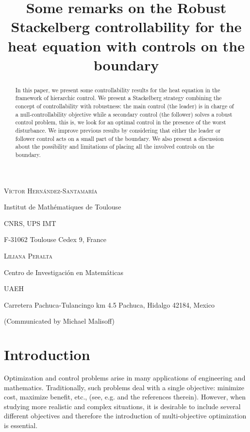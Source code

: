 \documentclass{dcds-bOF}
\title[Robust Stackelberg controllability for the heat equation] %
      {Some remarks on the Robust Stackelberg controllability for the heat equation with controls on the boundary}
\author[V\'ictor Hern\'andez-Santamar\'ia and Liliana Peralta]{}
\theoremstyle{definition}
\begin{document}
\maketitle

\centerline{\scshape V\'ictor Hern\'andez-Santamar\'ia}
\medskip
{\footnotesize
 \centerline{Institut de Math\'{e}matiques de
    Toulouse}
   \centerline{CNRS, UPS IMT}
   \centerline{F-31062 Toulouse Cedex 9,
    France}
} %

\medskip

\centerline{\scshape Liliana Peralta}
\medskip
{\footnotesize
 \centerline{Centro de Investigaci\'on en Matem\'aticas}
   \centerline{UAEH}
   \centerline{Carretera Pachuca-Tulancingo km 4.5 Pachuca, Hidalgo 42184, Mexico}
}

\bigskip

 \centerline{(Communicated by Michael Malisoff)}


\begin{abstract}
In this paper, we present some controllability results for the heat equation in the framework of hierarchic control. We present a Stackelberg strategy combining the concept of controllability with robustness: the main control (the leader) is in charge of a null-controllability objective while a secondary control (the follower) solves a robust control problem, this is, we look for an optimal control in the presence of the worst disturbance. We improve previous results by considering that either the leader or follower control acts on a small part of the boundary.  We also present a discussion about the possibility and limitations of placing all the involved controls on the boundary.
\end{abstract}

\section{Introduction}\label{sec_intro}
%
%
Optimization and control problems arise in many applications of engineering and mathematics. Traditionally, such problems deal with a single objective: minimize cost, maximize benefit, etc., (see, e.g. \cite{geering,trelat} and the references therein). However, when studying more realistic and complex situations, it is desirable to include several different objectives and therefore the introduction of multi-objective optimization is essential.
\end{document}
